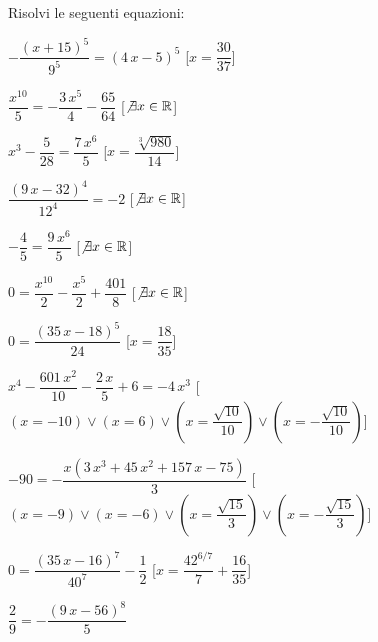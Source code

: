 \begin{esercizio}\label{ese:03.1}
Risolvi le seguenti equazioni:
\begin{enumeratea}
\item \(-{\dfrac{ \left( x+15 \right) ^{5}}{9^5}}= \left( 4\,x-5 \right) 
^{5}\) 
\hfill [\(x={\dfrac{30}{37}}\)]
\item \({\dfrac{{x}^{10}}{5}}=-{\dfrac{3\,{x}^{5}}{4}}-{\dfrac{65}{64}}\) 
\hfill [\(\not\exists x \in \mathbb{R}\)]
\item \({x}^{3}-{\dfrac{5}{28}}={\dfrac{7\,{x}^{6}}{5}}\) 
\hfill [\(x={\dfrac{\sqrt [3]{980}}{14}}\)]
\item \({\dfrac{ \left( 9\,x-32 \right) ^{4}}{12^4}}=-2\) 
\hfill [\(\not\exists x \in \mathbb{R}\)]
\item \(-{\dfrac{4}{5}}={\dfrac{9\,{x}^{6}}{5}}\) 
\hfill [\(\not\exists x \in \mathbb{R}\)]
\item \(0={\dfrac{{x}^{10}}{2}}-{\dfrac{{x}^{5}}{2}}+{\dfrac{401}{8}}\) 
\hfill [\(\not\exists x \in \mathbb{R}\)]
\item \(0={\dfrac{ \left( 35\,x-18 \right) ^{5}}{24}}\) 
\hfill [\(x={\dfrac{18}{35}}\)]
\item \({x}^{4}-{\dfrac{601\,{x}^{2}}{10}}-{\dfrac
{2\,x}{5}}+6=-4\,{x}^{3}\) 
\hfill [\((x=-10)\vee (x=6)\vee (x={\dfrac{\sqrt {10}}{10}})\vee 
(x=-{\dfrac
{\sqrt {10}}{10}})\)]
\item \(-90=-{\dfrac{x \left( 3\,{x}^{3}+45\,{x}^{2}+157\,x-75 \right) 
}{3}}\) 
\hfill [\((x=-9)\vee (x=-6)\vee (x={\dfrac{\sqrt {15}}{3}})\vee (x=-{\dfrac
{\sqrt 
{15}}{3}})\)]
\item \(0={\dfrac{ \left( 35\,x-16 \right) ^{7}}{40^7}}-{\dfrac{1}{2}}\) 
\hfill [\(x={\dfrac{4 {2}^{6/7}}{7}}+{\dfrac{16}{35}}\)]
\item \({\dfrac{2}{9}}=-{\dfrac{ \left( 9\,x-56 \right) ^{8}}{5}}\) 

\end{enumeratea}
\end{esercizio}
